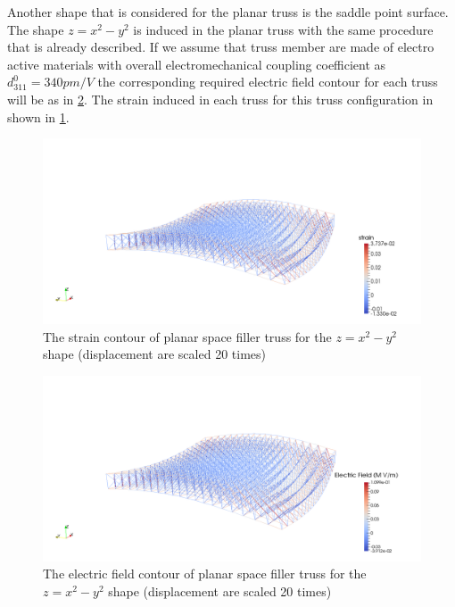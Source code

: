 Another shape that is considered for the planar truss is the saddle point surface.
The shape $z=x^2-y^2$ is induced in the planar truss with the same procedure that is already described.
If we assume that truss member are made of electro active materials with overall electromechanical coupling coefficient as $d_{311}^0=340pm/V$ the corresponding required electric field contour for each truss will be as in \ref{fig:planar_z_eq_x2_y2_efield_contour}.
The strain induced in each truss for this truss configuration in shown in \ref{fig:planar_z_eq_x2_y2_strain_contour}.

\begin{figure} 
\centering
\includegraphics[width=5.0in]{./chap_5_active_trusses/images_space_filler/planar_truss_z_eq_x2_y2_strain.png}
\caption{The strain contour of planar space filler truss for the $z=x^2-y^2$ shape (displacement are scaled 20 times)}
\label{fig:planar_z_eq_x2_y2_strain_contour}
\end{figure} 

\begin{figure} 
\centering
\includegraphics[width=5.0in]{./chap_5_active_trusses/images_space_filler/planar_truss_z_eq_x2_y2_elec_field.png}
\caption{The electric field contour of planar space filler truss for the $z=x^2-y^2$ shape (displacement are scaled 20 times)}
\label{fig:planar_z_eq_x2_y2_efield_contour}
\end{figure} 




